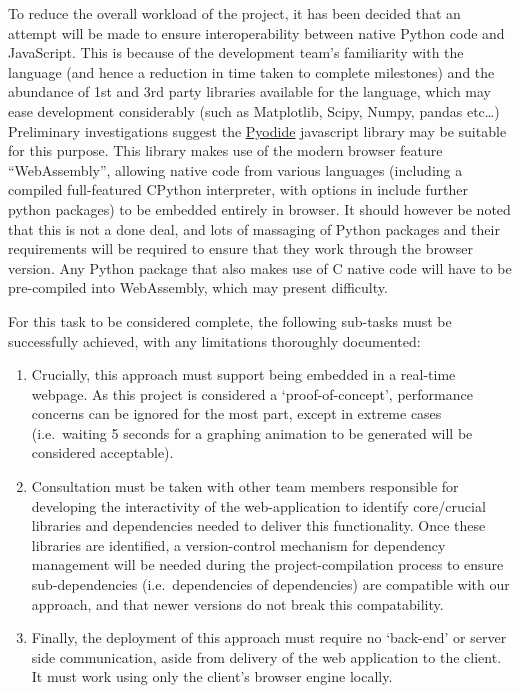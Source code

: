 \documentclass[
  paper=a4,
  ,captions=tableheading
]{scrartcl}
\begin{document}
To reduce the overall workload of the project, it has been decided that
an attempt will be made to ensure interoperability between native Python
code and JavaScript. This is because of the development team's
familiarity with the language (and hence a reduction in time taken to
complete milestones) and the abundance of 1st and 3rd party libraries
available for the language, which may ease development considerably
(such as Matplotlib, Scipy, Numpy, pandas etc\ldots) Preliminary
investigations suggest the
\href{https://pyodide.org/en/stable/}{Pyodide} javascript library may be
suitable for this purpose. This library makes use of the modern browser
feature ``WebAssembly'', allowing native code from various languages
(including a compiled full-featured CPython interpreter, with options in
include further python packages) to be embedded entirely in browser. It
should however be noted that this is not a done deal, and lots of
massaging of Python packages and their requirements will be required to
ensure that they work through the browser version. Any Python package
that also makes use of C native code will have to be pre-compiled into
WebAssembly, which may present difficulty.

For this task to be considered complete, the following sub-tasks must be
successfully achieved, with any limitations thoroughly documented: 
\begin{enumerate}
	\item Crucially, this approach must support being embedded in a real-time webpage. As this project is considered a `proof-of-concept', performance concerns can be ignored for the most part, except in extreme cases (i.e.~waiting 5 seconds for a graphing animation to be generated will be considered acceptable).
	\item Consultation must be taken with other team members responsible for developing the interactivity of the web-application to identify core/crucial libraries and dependencies needed to deliver this functionality. Once these libraries are identified, a version-control mechanism for dependency management will be needed during the project-compilation process to ensure sub-dependencies (i.e.~dependencies of dependencies) are compatible with our approach, and that newer versions do not break this compatability.
	\item Finally, the deployment of this approach must require no `back-end' or server side communication, aside from delivery of the web application to the client. It must work using only the client's browser engine locally.
\end{enumerate}
\end{document}
